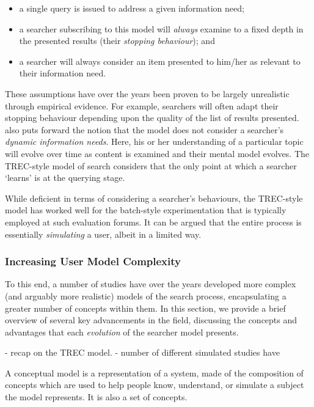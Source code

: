 \begin{itemize}
    \item{a single query is issued to address a given information need;}
    \item{a searcher subscribing to this model will \emph{always} examine to a fixed depth in the presented results (their \emph{stopping behaviour}); and}
    \item{a searcher will always consider an item presented to him/her as relevant to their information need.}
\end{itemize}

These assumptions have over the years been proven to be largely unrealistic through empirical evidence. For example, searchers will often adapt their stopping behaviour depending upon the quality of the list of results presented.~\cite{borlund2003iir_model} also puts forward the notion that the model does not consider a searcher's \emph{dynamic information needs}. Here, his or her understanding of a particular topic will evolve over time as content is examined and their mental model evolves. The TREC-style model of search considers that the only point at which a searcher `learns' is at the querying stage.

While deficient in terms of considering a searcher's behaviours, the TREC-style model has worked well for the batch-style experimentation that is typically employed at such evaluation forums. It can be argued that the entire process is essentially \emph{simulating} a user, albeit in a limited way.

\subsubsection{Increasing User Model Complexity}
To this end, a number of studies have over the years developed more complex (and arguably more realistic) models of the search process, encapsulating a greater number of concepts within them. In this section, we provide a brief overview of several key advancements in the field, discussing the concepts and advantages that each \emph{evolution} of the searcher model presents.



- recap on the TREC model.
- number of different simulated studies have 




A conceptual model is a representation of a system, made of the composition of concepts which are used to help people know, understand, or simulate a subject the model represents. It is also a set of concepts.

